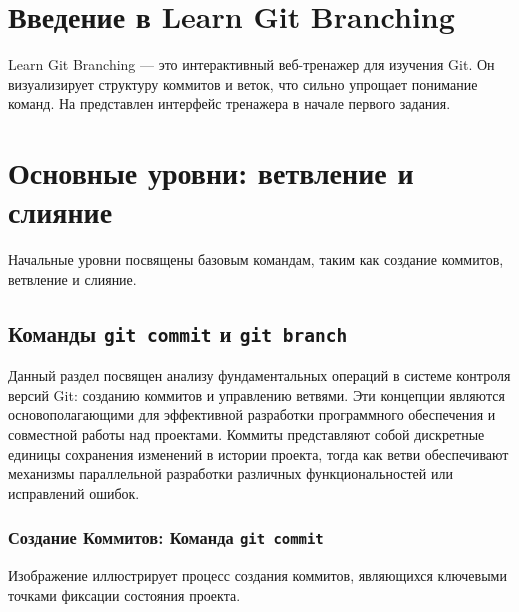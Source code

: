 \section{Введение в Learn Git Branching}\label{sec:learn-git-branching-intro}
Learn Git Branching — это интерактивный веб-тренажер для изучения Git.
Он визуализирует структуру коммитов и веток, что сильно упрощает понимание команд.
На  представлен интерфейс тренажера в начале первого задания.

\label{fig:lgb_main_screen}


\section{Основные уровни: ветвление и слияние}\label{sec:lgb-basic-branching-and-merging}
Начальные уровни посвящены базовым командам, таким как создание коммитов, ветвление и слияние.

\subsection{Команды \texttt{git commit} и \texttt{git branch}}\label{subsec:lgb-commit-and-branch}
Данный раздел посвящен анализу фундаментальных операций в системе контроля версий Git: созданию коммитов и управлению ветвями.
Эти концепции являются основополагающими для эффективной разработки программного обеспечения и совместной работы над проектами.
Коммиты представляют собой дискретные единицы сохранения изменений в истории проекта, тогда как ветви обеспечивают механизмы параллельной разработки различных функциональностей или исправлений ошибок.

\subsubsection{Создание Коммитов: Команда \texttt{git commit}}\label{subsubsec:git-commit}
Изображение  иллюстрирует процесс создания коммитов, являющихся ключевыми точками фиксации состояния проекта.

\label{fig:lgb_commit}

